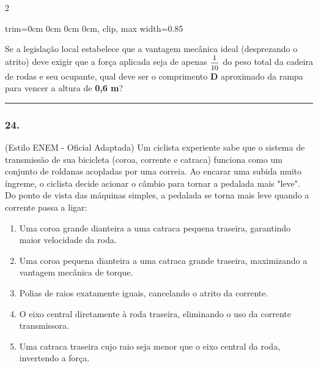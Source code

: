 \documentclass[twoside, 10pt, a4paper]{article}
\newlength{\espacoPreQuestao}\setlength{\espacoPreQuestao}{0.1cm}
\newlength{\espacoQuestao}\setlength{\espacoQuestao}{0.2cm}
\newlength{\espacoAlt}\setlength{\espacoAlt}{0.2cm}
\newcommand{\larguraTikz}{0.85\linewidth}
\begin{document}
\begin{multicols*}{2}
\begin{center}
\begin{adjustbox}{trim=0cm 0cm 0cm 0cm, clip, max width=\larguraTikz}
\end{adjustbox}
\end{center}
Se a legislação local estabelece que a vantagem mecânica ideal (desprezando o atrito) deve exigir que a força aplicada seja de apenas $ \mfrac{1}{10} $ do peso total da cadeira de rodas e seu ocupante, qual deve ser o comprimento \textbf{D} aproximado da rampa para vencer a altura de \textbf{0,6 m}?
\par\vspace{\espacoQuestao}

\noindent\textcolor{CorLinha}{\rule{\linewidth}{0.5pt}} 
\par\vspace{\espacoPreQuestao}
\subsubsection*{24.} (Estilo ENEM - Oficial Adaptada) Um ciclista experiente sabe que o sistema de transmissão de sua bicicleta (coroa, corrente e catraca) funciona como um conjunto de roldanas acopladas por uma correia. Ao encarar uma subida muito íngreme, o ciclista decide acionar o câmbio para tornar a pedalada mais "leve". Do ponto de vista das máquinas simples, a pedalada se torna mais leve quando a corrente passa a ligar:
\begin{enumerate}[label=\alph*), itemsep=\espacoAlt]
    \item Uma coroa grande dianteira a uma catraca pequena traseira, garantindo maior velocidade da roda.
    \item Uma coroa pequena dianteira a uma catraca grande traseira, maximizando a vantagem mecânica de torque.
    \item Polias de raios exatamente iguais, cancelando o atrito da corrente.
    \item O eixo central diretamente à roda traseira, eliminando o uso da corrente transmissora.
    \item Uma catraca traseira cujo raio seja menor que o eixo central da roda, invertendo a força.
\end{enumerate}
\par\vspace{\espacoQuestao}


\end{multicols*}
\end{document}
